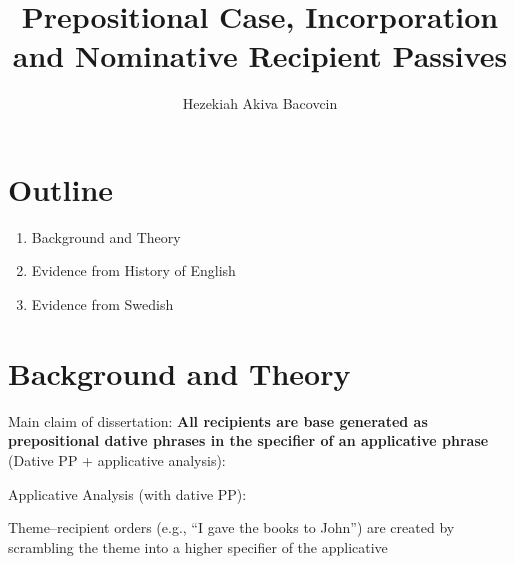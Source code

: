 \documentclass[11pt]{article}
\title{Prepositional Case, Incorporation and Nominative Recipient Passives}
\author{Hezekiah Akiva Bacovcin}
\begin{document}
\maketitle
\section{Outline}
\begin{enumerate}
	\item Background and Theory
	\item Evidence from History of English
	\item Evidence from Swedish
\end{enumerate}

\section{Background and Theory}
Main claim of dissertation: \textbf{All recipients are base generated as prepositional dative phrases in the specifier of an applicative phrase} (Dative PP + applicative analysis):

\begin{exe}
	\ex Applicative Analysis (with dative PP):\\
\end{exe}

Theme--recipient orders (e.g., ``I gave the books to John'') are created by scrambling the theme into a higher specifier of the applicative \citep{McGinnis.1998}

 
\end{document}

